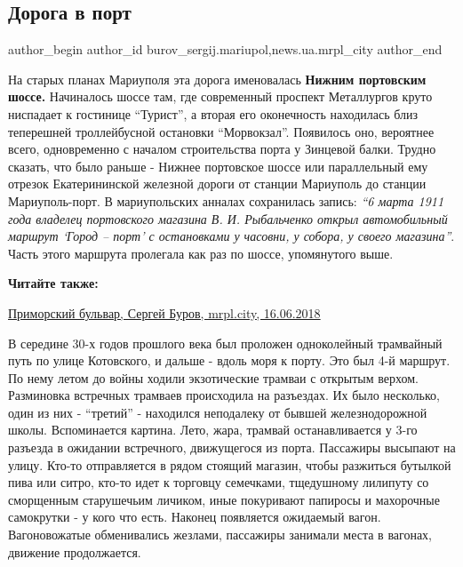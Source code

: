  
 
 
 
 
 
\subsection{Дорога в порт}
\label{sec:01_06_2019.stz.news.ua.mrpl_city.1.doroga_v_port}
 
\ifcmt
 author_begin
   author_id burov_sergij.mariupol,news.ua.mrpl_city
 author_end
\fi


На старых планах Мариуполя эта дорога именовалась \textbf{Нижним портовским шоссе.}
Начиналось шоссе там, где современный проспект Металлургов круто ниспадает к
гостинице \enquote{Турист}, а вторая его оконечность находилась близ теперешней
троллейбусной остановки \enquote{Морвокзал}. Появилось оно, вероятнее всего,
одновременно с началом строительства порта у Зинцевой балки. Трудно сказать,
что было раньше - Нижнее портовское шоссе или параллельный ему отрезок
Екатерининской железной дороги от станции Мариуполь до станции Мариуполь-порт.
В мариупольских анналах сохранилась запись: \emph{\enquote{6 марта 1911 года владелец
портовского магазина В. И. Рыбальченко открыл автомобильный маршрут \enquote{Город –
порт} с остановками у часовни, у собора, у своего магазина}}. Часть этого
маршрута пролегала как раз по шоссе, упомянутого выше.

\textbf{Читайте также:} 

\href{https://archive.org/details/16_06_2018.sergij_burov.mrpl_city.primorskij_bulvar}{%
Приморский бульвар, Сергей Буров,	mrpl.city, 16.06.2018}


В середине 30-х годов прошлого века был проложен одноколейный трамвайный путь
по улице Котовского, и дальше - вдоль моря к порту. Это был 4-й маршрут. По
нему летом до войны ходили экзотические трамваи с открытым верхом. Разминовка
встречных трамваев происходила на разъездах. Их было несколько, один из них -
\enquote{третий} - находился неподалеку от бывшей железнодорожной школы. Вспоминается
картина. Лето, жара, трамвай останавливается у 3-го разъезда в ожидании
встречного, движущегося из порта. Пассажиры высыпают на улицу. Кто-то
отправляется в рядом стоящий магазин, чтобы разжиться бутылкой пива или ситро,
кто-то идет к торговцу семечками, тщедушному лилипуту со сморщенным старушечьим
личиком, иные покуривают папиросы и махорочные самокрутки - у кого что есть.
Наконец появляется ожидаемый вагон. Вагоновожатые обменивались жезлами,
пассажиры занимали места в вагонах, движение продолжается.

